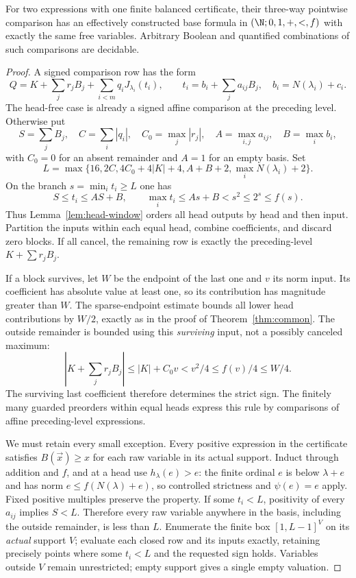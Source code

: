 \documentclass[11pt]{article}
\begin{document}
\begin{theorem}\label{thm:balanced}
For two expressions with one finite balanced certificate, their three-way
pointwise comparison has an effectively constructed base formula in
$(\N;0,1,+,<,f)$ with exactly the same free variables. Arbitrary Boolean
and quantified combinations of such comparisons are decidable.
\end{theorem}
\begin{proof}
A signed comparison row has the form
\begin{equation}\label{eq:balanced-row}
 Q=K+\sum_jr_jB_j+\sum_{i<m}q_iJ_{\lambda_i}(t_i),\qquad
 t_i=b_i+\sum_j a_{ij}B_j,\quad b_i=N(\lambda_i)+c_i.
\end{equation}
The head-free case is already a signed affine comparison at the preceding
level. Otherwise put
\[
 S=\sum_jB_j,\quad C=\sum_i|q_i|,\quad C_0=\max_j|r_j|,
 \quad A=\max_{i,j}a_{ij},\quad B=\max_i b_i,
\]
with $C_0=0$ for an absent remainder and $A=1$ for an empty basis. Set
\begin{equation}\label{eq:balanced-L}
 L=\max\{16,2C,4C_0+4|K|+4,A+B+2,\max_iN(\lambda_i)+2\}.
\end{equation}
On the branch $s=\min_i t_i\ge L$ one has
\[
 S\le t_i\le AS+B,\qquad
 \max_i t_i\le As+B<s^2\le2^s\le f(s).
\]
Thus Lemma~\ref{lem:head-window} orders all head outputs by head and then
input. Partition the inputs within each equal head, combine coefficients,
and discard zero blocks. If all cancel, the remaining row is exactly the
preceding-level $K+\sum r_jB_j$.

If a block survives, let $W$ be the endpoint of the last one and $v$ its
norm input. Its coefficient has absolute value at least one, so its
contribution has magnitude greater than $W$. The sparse-endpoint estimate
bounds all lower head contributions by $W/2$, exactly as in the proof of
Theorem~\ref{thm:common}. The outside remainder is bounded using this
\emph{surviving} input, not a possibly canceled maximum:
\[
 \left|K+\sum_jr_jB_j\right|\le |K|+C_0v
          <v^2/4\le f(v)/4\le W/4.
\]
The surviving last coefficient therefore determines the strict sign.
The finitely many guarded preorders within equal heads express this rule
by comparisons of affine preceding-level expressions.

We must retain every small exception. Every positive expression in the
certificate satisfies $B(\vec x)\ge x$ for each raw variable in its
actual support. Induct through addition and $f$, and at a head use
$h_\lambda(e)>e$: the finite ordinal $e$ is below $\lambda+e$ and has
norm $e\le f(N(\lambda)+e)$, so controlled strictness and $\psi(e)=e$
apply. Fixed positive multiples preserve the property. If some $t_i<L$,
positivity of every $a_{ij}$ implies $S<L$. Therefore every raw variable
anywhere in the basis, including the outside remainder, is less than $L$.
Enumerate the finite box $[1,L-1]^V$ on its \emph{actual} support $V$;
evaluate each closed row and its inputs exactly, retaining precisely
points where some $t_i<L$ and the requested sign holds. Variables outside
$V$ remain unrestricted; empty support gives a single empty valuation.


\end{proof}
\end{document}

